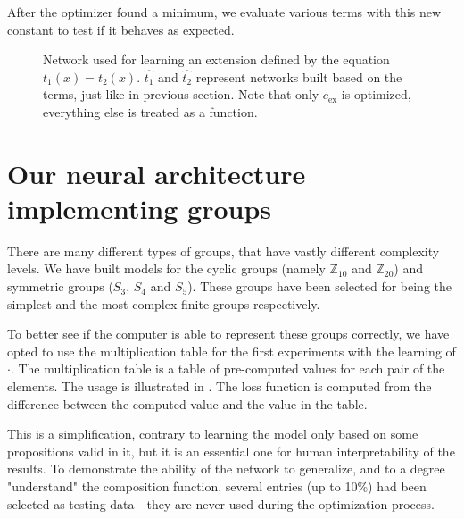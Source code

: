 After the optimizer found a minimum, we evaluate various terms with this new constant to test if it behaves as expected.

\begin{figure}
\caption{Network used for learning an extension defined by the equation $t_1(x)=t_2(x)$. $\widehat{t_1}$ and $\widehat{t_2}$ represent networks built based on the terms, just like in previous section. Note that only $c_{\text{ex}}$ is optimized, everything else is treated as a function.}
\centering
\label{learning_extension}
\end{figure}

\section{Our neural architecture implementing groups}
\label{section:group_impl}
There are many different types of groups, that have vastly different complexity levels. We have built models for the cyclic groups (namely $\mathbb{Z}_{10}$ and $\mathbb{Z}_{20}$) and symmetric groups ($S_3$, $S_4$ and $S_5$). These groups have been selected for being the simplest and the most complex finite groups respectively.

To better see if the computer is able to represent these groups correctly, we have opted to use the multiplication table for the first experiments with the learning of $\cdot$. The multiplication table is a table of pre-computed values for each pair of the elements. The usage is illustrated in . The loss function is computed from the difference between the computed value and the value in the table.

This is a simplification, contrary to learning the model only based on some propositions valid in it, but it is an essential one for human interpretability of the results. To demonstrate the ability of the network to generalize, and to a degree "understand" the composition function, several entries (up to 10\%) had been selected as testing data - they are never used during the optimization process.\\


